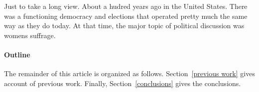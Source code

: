 Just to take a long view.  About a hudred years ago in the United States.
There was a functioning democracy and elections that operated pretty much
the same way as they do today. At that time, the major topic of
political discussion was womens suffrage.  


\paragraph{Outline}
The remainder of this article is organized as follows.
Section~\ref{previous work} gives account of previous work.
Finally, Section~\ref{conclusions} gives the conclusions.

